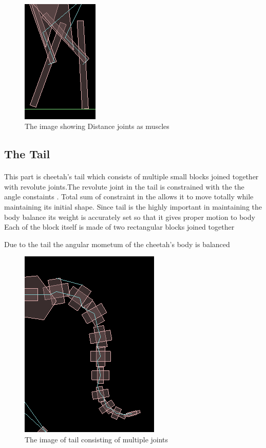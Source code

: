 \documentclass[11pt]{article}
\begin{document}
\paragraph{}
\begin{figure}[!ht]
    \centering
        \includegraphics[scale=0.8]{joint.png}
        \caption{The image showing Distance joints as muscles}
\end{figure}

\subsection{The Tail}
\paragraph{} 
This part is cheetah's tail which consists of multiple small blocks joined together with revolute joints.The revolute joint in the tail is constrained with the the angle constaints . Total sum of constraint in the allows it to move totally while maintaining its initial shape. Since tail is the highly important in maintaining the body balance its weight is accurately set so that it gives proper motion to body
\newline
Each of the block itself is made of two rectangular blocks joined together


Due to the tail the angular mometum of the cheetah's body is balanced
\begin{figure}[!ht]
    \centering
        \includegraphics[scale=0.6]{tail.png}
        \caption{The image of tail consisting of multiple joints}
\end{figure}
\end{document}
